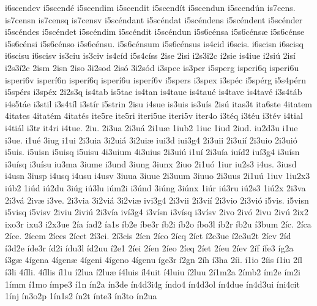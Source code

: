 {i6scendev
i5scend^^e9
i5scendim
i5scendit
i5scend^^edt
i5scendun
i5scend^^fan
is7cens.
is7censn
is7censq
is7censv
i5sc^^e9ndant
i5sc^^e9ndat
i5sc^^e9ndens
i5sc^^e9ndent
i5sc^^e9nder
i5sc^^e9ndes
i5sc^^e9ndet
i5sc^^e9ndim
i5sc^^e9ndit
i5sc^^e9ndun
i5s6c^^e9nsa
i5s6c^^e9ns^^e6
i5s6c^^e9nse
i5s6c^^e9nsi
i5s6c^^e9nso
i5s6c^^e9nsu.
i5s6c^^e9nsum
i5s6c^^e9nsus
is4cid
i6scis.
i6scisn
i6scisq
i6scisu
i6scisv
is3ciu
is3civ
is4c^^edd
i5s4c^^edss
2ise
2isi
i2s3i2c
i2sie
is4iue
i2si^^fa
2is^^ed
i2s3^^ed2c
2ism
2isn
2iso
3i2sod
2is^^f3
3i2s^^f3d
i3spec
is3per
i5sperg
isperi6q
isperi6u
isperi6v
isper^^ed6n
isper^^ed6q
isper^^ed6u
isper^^ed6v
i5spers
i3spex
i3sp^^e9c
i5sp^^e9rg
i5s4p^^e9rn
i5sp^^e9rs
i3sp^^e9x
2i2s3q
is4tab
is5tae
is4tan
is4taue
is4tau^^e9
is4tave
is4tav^^e9
i3s4t^^e1b
i4s5t^^e1e
i3stil
i3s4t^^edl
i3st^^edr
i5strin
2isu
i4sue
is3uis
is3u^^eds
2is^^fa
itas3t
ita6ste
4itatem
4itates
4itat^^e9m
4itat^^e9s
ite5re
ite5ri
iteri5ue
iteri5v
iter4o
i3t^^e9q
i3t^^e9u
i3t^^e9v
i4tial
i4ti^^e1l
i3tr
it4ri
i4tue.
2iu.
2i3ua
2i3u^^e1
2i1u^^e6
1iub2
1iuc
1iud
2iud.
iu2d3u
i1ue
i3ue.
i1u^^e9
3iug
i1ui
2i3uia
3i2ui^^e1
3i2ui^^e6
iui3d
iui3g4
2i3uii
2i3ui^^ed
2i3uio
2i3ui^^f3
i5uis.
i5uisn
i5uisq
i5uisu
4i3uium
4i3uius
2i3ui^^fa
i1u^^ed
2i3u^^eda
iu^^edd2
iu^^ed3g4
i3u^^edsn
i3u^^edsq
i3u^^edsu
iu3ma
3iume
i3und
3iung
3iunx
2iuo
2i1u^^f3
1iur
iu2s3
i4us.
3iusd
i4usn
3iusp
i4usq
i4usu
i4usv
3iuua
3iuue
2i3uum
3iuuo
2i3uus
2i1u^^fa
1iuv
1iu2x3
i^^fab2
1i^^fad
i^^fa2du
3i^^fag
i^^fa3lu
i^^fam2i
i3^^fand
3i^^fang
3i^^fanx
1i^^far
i^^fa3ru
i^^fa2s3
1i^^fa2x
2i3va
2i3v^^e1
2iv^^e6
i3ve.
2i3via
3i2vi^^e1
3i2vi^^e6
ivi3g4
2i3vii
2i3vi^^ed
2i3vio
2i3vi^^f3
i5vis.
i5visn
i5visq
i5visv
2iviu
2ivi^^fa
2i3v^^eda
iv^^ed3g4
i3v^^edsn
i3v^^edsq
i3v^^edsv
2ivo
2iv^^f3
2ivu
2iv^^fa
2ix2
ixo3r
ixu3
i2x3ue
2^^eda
^^edad2
^^eda1s
^^edb2e
^^edbe3r
^^edb2i
^^edb2o
^^edbo3l
^^edb2r
^^edb2u
^^ed3bum
2^^edc.
2^^edca
2^^edce.
2^^edcem
2^^edces
2^^edcet
2^^ed3ci.
2^^ed3cis
2^^edcn
2^^edco
2^^edcq
2^^edct
^^ed2c3ue
^^ed2c3u2t
2^^edcv
2^^edd
^^ed3d2e
^^edde3r
^^edd2i
^^eddu3l
^^edd2uu
^^ed2e1
2^^edei
2^^eden
2^^edeo
2^^edeq
2^^edet
2^^edeu
2^^edev
2^^edf
^^edfe3
^^edg2a
^^ed3g^^e6
4^^edgena
4^^edgen^^e6
4^^edgeni
4^^edgeno
4^^edgenu
^^edge3r
^^ed2gn
2^^edh
^^ed3ha
2^^edi.
^^ed1io
2^^edis
^^ed1iu
2^^edl
^^ed3li
4^^edlli.
4^^edllis
^^edl1u
^^ed2lua
^^ed2lu^^e6
^^ed4luis
^^edl4uit
^^ed4luiu
^^ed2luu
2^^ed1m2a
2^^edmb2
^^edm2e
^^edm2i
1^^edmm
^^ed1mo
^^edmpe3
^^ed1n
^^edn2a
^^edn3de
^^edn4d3i4g
^^edndo4
^^edn4d3ol
^^edn4due
^^edn4d3ui
^^edni4cit
1^^ednj
^^edn3o2p
1^^edn1s2
^^edn2t
^^ednte3
^^edn3to
^^edn2ua
}
